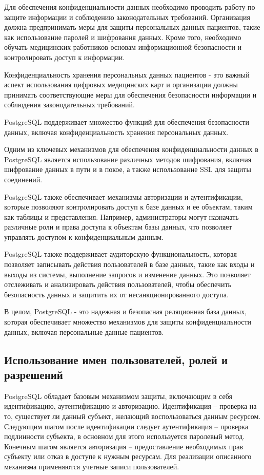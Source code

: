 Для обеспечения конфиденциальности данных необходимо проводить работу по защите информации и соблюдению законодательных требований. Организация должна предпринимать меры для защиты персональных данных пациентов, такие как использование паролей и шифрования данных. Кроме того, необходимо обучать медицинских работников основам информационной безопасности и контролировать доступ к информации.

Конфиденциальность хранения персональных данных пациентов - это важный аспект использования цифровых медицинских карт и организации должны принимать соответствующие меры для обеспечения безопасности информации и соблюдения законодательных требований.

PostgreSQL поддерживает множество функций для обеспечения безопасности данных, включая конфиденциальность хранения персональных данных.

Одним из ключевых механизмов для обеспечения конфиденциальности данных в PostgreSQL является использование различных методов шифрования, включая шифрование данных в пути и в покое, а также использование SSL для защиты соединений.

PostgreSQL также обеспечивает механизмы авторизации и аутентификации, которые позволяют контролировать доступ к базе данных и ее объектам, таким как таблицы и представления. Например, администраторы могут назначать различные роли и права доступа к объектам базы данных, что позволяет управлять доступом к конфиденциальным данным.

PostgreSQL также поддерживает аудиторскую функциональность, которая позволяет записывать действия пользователей в базе данных, такие как входы и выходы из системы, выполнение запросов и изменение данных. Это позволяет отслеживать и анализировать действия пользователей, чтобы обеспечить безопасность данных и защитить их от несанкционированного доступа.

В целом, PostgreSQL - это надежная и безопасная реляционная база данных, которая обеспечивает множество механизмов для защиты конфиденциальности данных, включая персональные данные пациентов.




\subsection{Использование имен пользователей, ролей и разрешений}

PostgreSQL обладает базовым механизмом защиты, включающим в себя идентификацию, аутентификацию и авторизацию. Идентификация – проверка на то, существует ли данный субъект, желающий воспользоваться данным ресурсом. Следующим шагом после идентификации следует аутентификация – проверка подлинности субъекта, в основном для этого используется паролевый метод. Конечным шагом является авторизация – предоставление необходимых прав субъекту или отказ в доступе к нужным ресурсам. Для реализации описанного механизма применяются учетные записи пользователей.

